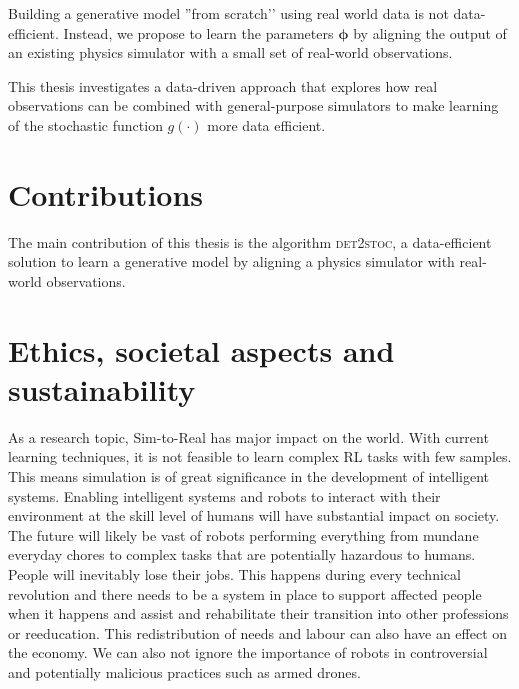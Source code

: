\documentclass{kththesis}
\newcommand{\vph}{\boldsymbol{\phi}}
\newcommand{\dettostoc}{\textsc{det2stoc}}
\begin{document}
Building a generative model ''from scratch’' using real world data is not data-efficient. Instead, we propose to learn the parameters $\vph$ by aligning the output of an existing physics simulator with a small set of real-world observations. 

This thesis investigates a data-driven approach that explores how real observations can be combined with general-purpose simulators to make learning of the stochastic function $g(\cdot)$ more data efficient.


\section{Contributions}

The main contribution of this thesis is the algorithm \dettostoc{}, a data-efficient solution to learn a generative model by aligning a physics simulator with real-world observations.

\section{Ethics, societal aspects and sustainability}

As a research topic, Sim-to-Real has major impact on the world. With current learning techniques, it is not feasible to learn complex RL tasks with few samples. This means simulation is of great significance in the development of intelligent systems. Enabling intelligent systems and robots to interact with their environment at the skill level of humans will have substantial impact on society. The future will likely be vast of robots performing everything from mundane everyday chores to complex tasks that are potentially hazardous to humans. People will inevitably lose their jobs. This happens during every technical revolution and there needs to be a system in place to support affected people when it happens and assist and rehabilitate their transition into other professions or reeducation. This redistribution of needs and labour can also have an effect on the economy. We can also not ignore the importance of robots in controversial and potentially malicious practices such as armed drones.

\end{document}
